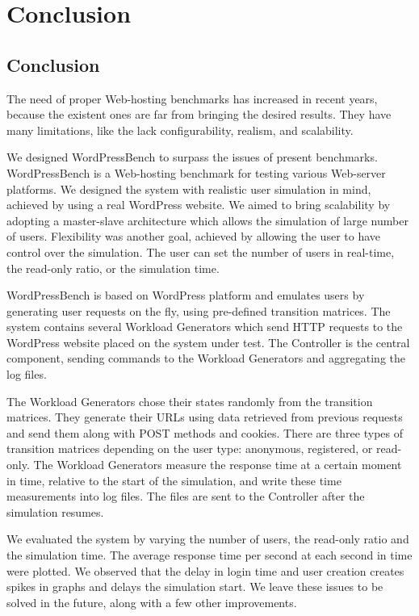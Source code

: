 \chapter{Conclusion}
\label{chapter:chapter6}

\section{Conclusion}
\label{sec:system-architecture}

The need of proper Web-hosting benchmarks has increased in recent years, because the existent ones are far from bringing the desired results. They have many limitations, like the lack configurability, realism, and scalability.

We designed WordPressBench to surpass the issues of present benchmarks. WordPressBench is a Web-hosting benchmark for testing various Web-server platforms. We designed the system with realistic user simulation in mind, achieved by using a real WordPress website. We aimed to bring scalability by adopting a master-slave architecture which allows the simulation of large number of users. Flexibility was another goal, achieved by allowing the user to have control over the simulation. The user can set the number of users in real-time, the read-only ratio, or the simulation time.

WordPressBench is based on WordPress platform and emulates users by generating user requests on the fly, using pre-defined transition matrices. The system contains several Workload Generators which send HTTP requests to the WordPress website placed on the system under test. The Controller is the central component, sending commands to the Workload Generators and aggregating the log files.

The Workload Generators chose their states randomly from the transition matrices. They generate their URLs using data retrieved from previous requests and send them along with POST methods and cookies. There are three types of transition matrices depending on the user type: anonymous, registered, or read-only. The Workload Generators measure the response time at a certain moment in time, relative to the start of the simulation, and write these time measurements into log files. The files are sent to the Controller after the simulation resumes.

We evaluated the system by varying the number of users, the read-only ratio and the simulation time. The average response time per second at each second in time were plotted. We observed that the delay in login time and user creation creates spikes in graphs and delays the simulation start. We leave these issues to be solved in the future, along with a few other improvements.

